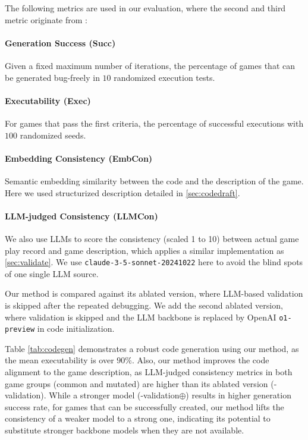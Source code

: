 The following metrics are used in our evaluation, where the second and third metric originate from \cite{chatdev}:

\paragraph{Generation Success (Succ)} Given a fixed maximum number of iterations, the percentage of games that can be generated bug-freely in $10$ randomized execution tests.

\paragraph{Executability (Exec)} For games that pass the first criteria, the percentage of successful executions with $100$ randomized seeds.

\paragraph{Embedding Consistency (EmbCon)} Semantic embedding similarity between the code and the description of the game. Here we used structurized description detailed in \ref{sec:codedraft}.

\paragraph{LLM-judged Consistency (LLMCon)} We also use LLMs to score the consistency (scaled 1 to 10) between actual game play record and game description, which applies a similar implementation as \ref{sec:validate}. We use \texttt{claude-3-5-sonnet-20241022} here to avoid the blind spots of one single LLM source.
    

Our method is compared against its ablated version, where LLM-based validation is skipped after the repeated debugging. We add the second ablated version, where validation is skipped and the LLM backbone is replaced by OpenAI \texttt{o1-preview} in code initialization.

Table \ref{tab:codegen} demonstrates a robust code generation using our method, as the mean executability is over $90\%$. 
Also, our method improves the code alignment to the game description, as LLM-judged consistency metrics in both game groups (common and mutated) are higher than its ablated version (-validation). While a stronger model (-validation$\oplus$) results in higher generation success rate, for games that can be successfully created, our method lifts the consistency of a weaker model to a strong one, indicating its potential to substitute stronger backbone models when they are not available.

